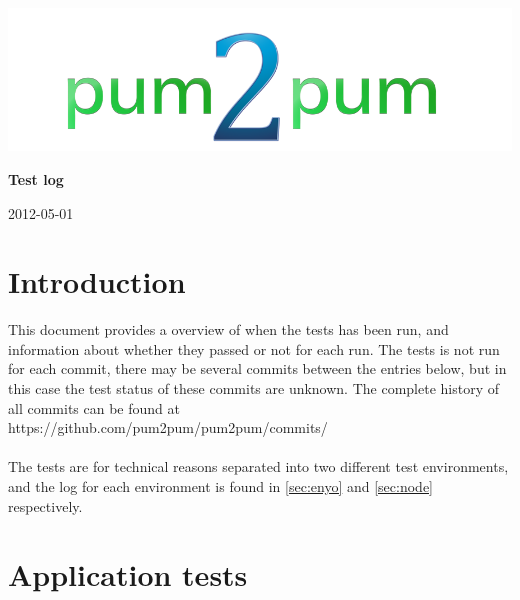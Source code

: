 \documentclass[a4paper, 12pt, titlepage]{article}
\begin{document}
	
	\begin{titlepage}
		
		\includegraphics[scale=0.4]{logoNormal.png}
		
		\vspace{6cm}
		
		\begin{center}
			\Huge{\textbf{Test log}} %
			
			\vspace{0.5cm}
			
			\huge{2012-05-01} %
		\end{center}
		
	\end{titlepage}
	
	\newpage


	\section{Introduction}
	This document provides a overview of when the tests has been run, and  information about whether they passed or not for each run. The tests is not run for each commit, there may be several commits between the entries below, but in this case the test status of these commits are unknown. The complete history of all commits can be found at\\

	https://github.com/pum2pum/pum2pum/commits/\\\\
	The tests are for technical reasons separated into two different test environments, and the log for each environment is found in \autoref{sec:enyo} and \autoref{sec:node} respectively.\\


	\section{Application tests}
	\label{sec:enyo}
\end{document}

